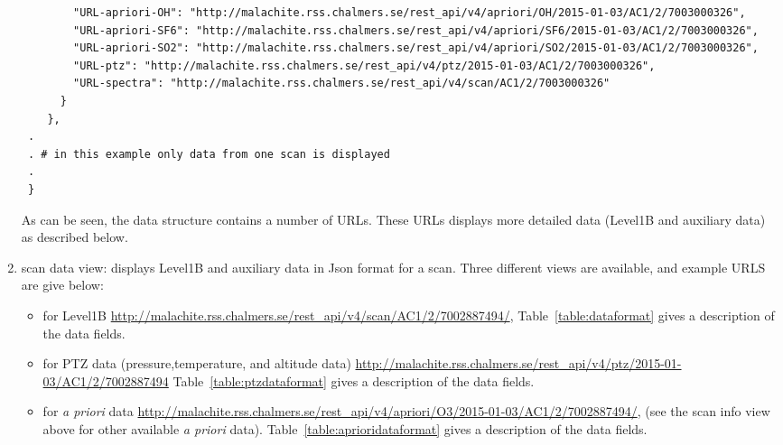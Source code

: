 \begin{enumerate}
\begin{tiny}
\begin{verbatim}
        "URL-apriori-OH": "http://malachite.rss.chalmers.se/rest_api/v4/apriori/OH/2015-01-03/AC1/2/7003000326", 
        "URL-apriori-SF6": "http://malachite.rss.chalmers.se/rest_api/v4/apriori/SF6/2015-01-03/AC1/2/7003000326", 
        "URL-apriori-SO2": "http://malachite.rss.chalmers.se/rest_api/v4/apriori/SO2/2015-01-03/AC1/2/7003000326", 
        "URL-ptz": "http://malachite.rss.chalmers.se/rest_api/v4/ptz/2015-01-03/AC1/2/7003000326", 
        "URL-spectra": "http://malachite.rss.chalmers.se/rest_api/v4/scan/AC1/2/7003000326"
      }
    },
 .
 . # in this example only data from one scan is displayed
 . 
 }  
\end{verbatim}
\end{tiny}
As can be seen, the data structure contains a number of URLs. These URLs displays more detailed
data (Level1B and auxiliary data) as described below.


\item scan data view: displays Level1B and auxiliary data in Json format for a scan.
Three different views are available, and example URLS are give below: 
\begin{itemize}
\item for Level1B \url{http://malachite.rss.chalmers.se/rest_api/v4/scan/AC1/2/7002887494/},
     Table~\ref{table:dataformat} gives a description of the data fields.

\item for PTZ data (pressure,temperature, and altitude data) 
\url{http://malachite.rss.chalmers.se/rest_api/v4/ptz/2015-01-03/AC1/2/7002887494}
 Table~\ref{table:ptzdataformat} gives a description of the data fields.

\item for \textit{a priori}  data 
\url{http://malachite.rss.chalmers.se/rest_api/v4/apriori/O3/2015-01-03/AC1/2/7002887494/},
(see the scan info view above for other available \textit{a priori} data).
 Table~\ref{table:aprioridataformat} gives a description of the data fields.
 
\end{itemize}
	

\end{enumerate}

\clearpage
\newpage

